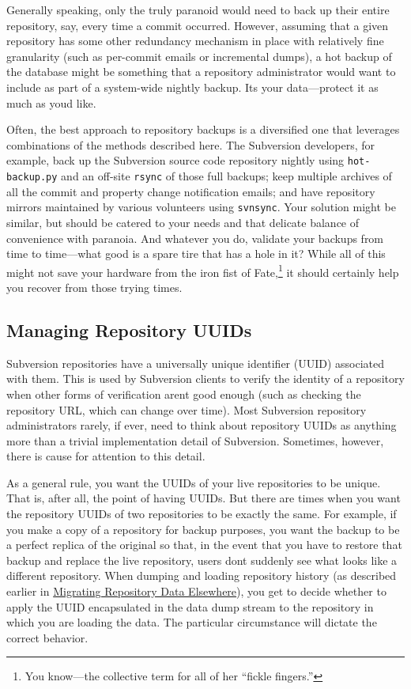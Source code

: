 Generally speaking, only the truly paranoid would need to back up their
entire repository, say, every time a commit occurred. However, assuming
that a given repository has some other redundancy mechanism in place
with relatively fine granularity (such as per-commit emails or
incremental dumps), a hot backup of the database might be something that
a repository administrator would want to include as part of a
system-wide nightly backup. It\textquotesingle s your data---protect it
as much as you\textquotesingle d like.

Often, the best approach to repository backups is a diversified one that
leverages combinations of the methods described here. The Subversion
developers, for example, back up the Subversion source code repository
nightly using \texttt{hot-backup.py} and an off-site \texttt{rsync} of
those full backups; keep multiple archives of all the commit and
property change notification emails; and have repository mirrors
maintained by various volunteers using \texttt{svnsync}. Your solution
might be similar, but should be catered to your needs and that delicate
balance of convenience with paranoia. And whatever you do, validate your
backups from time to time---what good is a spare tire that has a hole in
it? While all of this might not save your hardware from the iron fist of
Fate,\footnote{You know---the collective term for all of her ``fickle
  fingers.''} it should certainly help you recover from those trying
times.

\subsection{Managing Repository UUIDs}\label{svn.reposadmin.maint.uuids}

Subversion repositories have a universally unique identifier (UUID)
associated with them. This is used by Subversion clients to verify the
identity of a repository when other forms of verification
aren\textquotesingle t good enough (such as checking the repository URL,
which can change over time). Most Subversion repository administrators
rarely, if ever, need to think about repository UUIDs as anything more
than a trivial implementation detail of Subversion. Sometimes, however,
there is cause for attention to this detail.

As a general rule, you want the UUIDs of your live repositories to be
unique. That is, after all, the point of having UUIDs. But there are
times when you want the repository UUIDs of two repositories to be
exactly the same. For example, if you make a copy of a repository for
backup purposes, you want the backup to be a perfect replica of the
original so that, in the event that you have to restore that backup and
replace the live repository, users don\textquotesingle t suddenly see
what looks like a different repository. When dumping and loading
repository history (as described earlier in
\hyperref[svn.reposadmin.maint.migrate]{Migrating Repository Data
Elsewhere}), you get to decide whether to apply the UUID encapsulated in
the data dump stream to the repository in which you are loading the
data. The particular circumstance will dictate the correct behavior.

